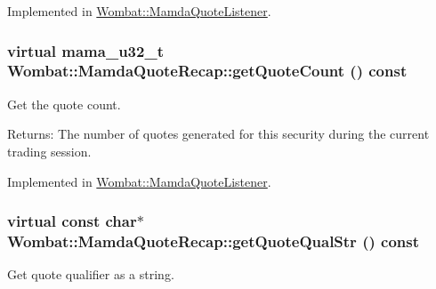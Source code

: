 Implemented in \hyperlink{classWombat_1_1MamdaQuoteListener_b74788d3c90fce551bab93ed062a0458}{Wombat::Mamda\-Quote\-Listener}.\hypertarget{classWombat_1_1MamdaQuoteRecap_538b0e423e2ecf6b4be494bfc07186eb}{
\subsubsection[getQuoteCount]{\setlength{\rightskip}{0pt plus 5cm}virtual mama\_\-u32\_\-t Wombat::Mamda\-Quote\-Recap::get\-Quote\-Count () const}}
\label{classWombat_1_1MamdaQuoteRecap_538b0e423e2ecf6b4be494bfc07186eb}


Get the quote count. 

\begin{Desc}
\item[Returns:]The number of quotes generated for this security during the current trading session. \end{Desc}


Implemented in \hyperlink{classWombat_1_1MamdaQuoteListener_85066bf1980233f52a8db81584537edf}{Wombat::Mamda\-Quote\-Listener}.\hypertarget{classWombat_1_1MamdaQuoteRecap_fb02eb53de95ff3bd9755f3e6a179db6}{
\subsubsection[getQuoteQualStr]{\setlength{\rightskip}{0pt plus 5cm}virtual const char$\ast$ Wombat::Mamda\-Quote\-Recap::get\-Quote\-Qual\-Str () const}}
\label{classWombat_1_1MamdaQuoteRecap_fb02eb53de95ff3bd9755f3e6a179db6}


Get quote qualifier as a string. 

